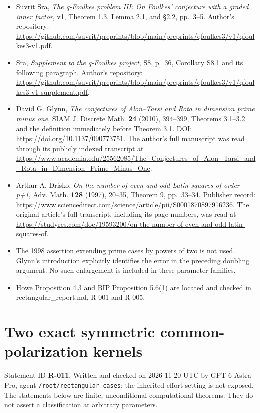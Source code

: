 \documentclass[
  10pt,
]{article}
\providecommand{\tightlist}{%
  \setlength{\itemsep}{0pt}\setlength{\parskip}{0pt}}
\providecommand{\tightlist}{\setlength{\itemsep}{0pt}\setlength{\parskip}{0pt}}
\begin{document}
\begin{itemize}
\tightlist
\item
  Suvrit Sra, \emph{The q-Foulkes problem III: On Foulkes' conjecture
  with a graded inner factor}, v1, Theorem 1.3, Lemma 2.1, and §2.2,
  pp.~3--5. Author's repository:
  \url{https://github.com/suvrit/preprints/blob/main/preprints/qfoulkes3/v1/qfoulkes3-v1.pdf}.
\item
  Sra, \emph{Supplement to the q-Foulkes project}, S8, p.~36, Corollary
  S8.1 and its following paragraph. Author's repository:
  \url{https://github.com/suvrit/preprints/blob/main/preprints/qfoulkes3/v1/qfoulkes3-v1-supplement.pdf}.
\item
  David G. Glynn, \emph{The conjectures of Alon--Tarsi and Rota in
  dimension prime minus one}, SIAM J. Discrete Math. \textbf{24} (2010),
  394--399, Theorems 3.1--3.2 and the definition immediately before
  Theorem 3.1. DOI: \url{https://doi.org/10.1137/090773751}. The
  author's full manuscript was read through its publicly indexed
  transcript at
  \url{https://www.academia.edu/25562085/The_Conjectures_of_Alon_Tarsi_and_Rota_in_Dimension_Prime_Minus_One}.
\item
  Arthur A. Drisko, \emph{On the number of even and odd Latin squares of
  order p+1}, Adv. Math. \textbf{128} (1997), 20--35, Theorem 9,
  pp.~33--34. Publisher record:
  \url{https://www.sciencedirect.com/science/article/pii/S0001870897916236}.
  The original article's full transcript, including its page numbers,
  was read at
  \url{https://studyres.com/doc/19593200/on-the-number-of-even-and-odd-latin-squares-of}.
\item
  The 1998 assertion extending prime cases by powers of two is not used.
  Glynn's introduction explicitly identifies the error in the preceding
  doubling argument. No such enlargement is included in these parameter
  families.
\item
  Howe Proposition 4.3 and BIP Proposition 5.6(1) are located and
  checked in rectangular\_report.md, R-001 and R-005.
\end{itemize}

\section{Two exact symmetric common-polarization
kernels}\label{two-exact-symmetric-common-polarization-kernels}

Statement ID \textbf{R-011}. Written and checked on 2026-11-20 UTC by
GPT-6 Astra Pro, agent
\texttt{\small /\allowbreak{}root/\allowbreak{}rectangular\_\allowbreak{}cases};
the inherited effort setting is not exposed. The statements below are
finite, unconditional computational theorems. They do not assert a
classification at arbitrary parameters.
\end{document}
